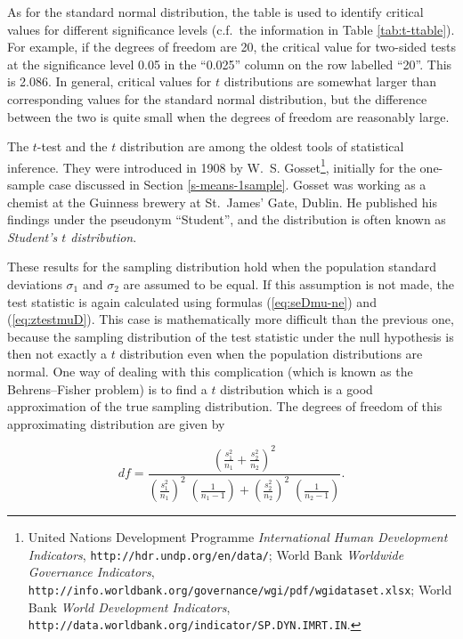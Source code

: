 \documentclass[11pt,a4paper,openany]{book}
\let\rmarkdownfootnote\footnote%
\def\footnote{\protect\rmarkdownfootnote}
\begin{document}
As for the standard normal distribution, the table is used to identify
critical values for different significance levels (c.f.~the information
in Table \ref{tab:t-ttable}). For example, if the degrees of freedom are
20, the critical value for two-sided tests at the significance level
0.05 in the ``0.025'' column on the row labelled ``20''. This is 2.086.
In general, critical values for \(t\) distributions are somewhat larger
than corresponding values for the standard normal distribution, but the
difference between the two is quite small when the degrees of freedom
are reasonably large.

The \(t\)-test and the \(t\) distribution are among the oldest tools of
statistical inference. They were introduced in 1908 by W.~S.
Gosset\footnote{United Nations Development Programme \emph{International
  Human Development Indicators}, \texttt{http://hdr.undp.org/en/data/};
  World Bank \emph{Worldwide Governance Indicators},
  \texttt{http://info.worldbank.org/governance/wgi/pdf/wgidataset.xlsx};
  World Bank \emph{World Development Indicators},
  \texttt{http://data.worldbank.org/indicator/SP.DYN.IMRT.IN}.},
initially for the one-sample case discussed in Section
\ref{s-means-1sample}. Gosset was working as a chemist at the Guinness
brewery at St.~James' Gate, Dublin. He published his findings under the
pseudonym ``Student'', and the distribution is often known as
\emph{Student's \(t\) distribution}.

These results for the sampling distribution hold when the population
standard deviations \(\sigma_{1}\) and \(\sigma_{2}\) are assumed to be
equal. If this assumption is not made, the test statistic is again
calculated using formulas (\ref{eq:seDmu-ne}) and (\ref{eq:ztestmuD}).
This case is mathematically more difficult than the previous one,
because the sampling distribution of the test statistic under the null
hypothesis is then not exactly a \(t\) distribution even when the
population distributions are normal. One way of dealing with this
complication (which is known as the Behrens--Fisher problem) is to find
a \(t\) distribution which is a good approximation of the true sampling
distribution. The degrees of freedom of this approximating distribution
are given by

\begin{equation}df=\frac{\left(
\frac{s^{2}_{1}}{n_{1}}+
\frac{s^{2}_{2}}{n_{2}}
\right)^{2}}
{
\left(\frac{s_{1}^{2}}{n_{1}}\right)^{2}\;
\left(\frac{1}{n_{1}-1}\right)
+
\left(\frac{s_{2}^{2}}{n_{2}}\right)^{2}\;
\left(\frac{1}{n_{2}-1}\right)
}.
\label{eq:satter-df}\end{equation}
\end{document}
